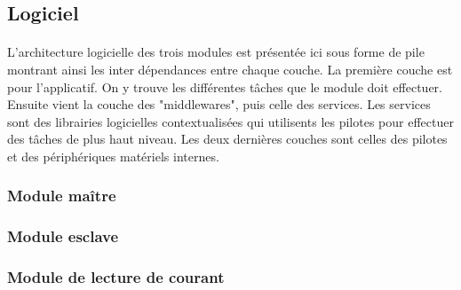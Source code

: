 \subsection{Logiciel}
	\paragraph*{}
	L'architecture logicielle des trois modules est présentée ici sous forme de pile montrant ainsi les inter dépendances entre chaque couche. La première couche est pour l'applicatif. On y trouve les différentes tâches que le module doit effectuer. Ensuite vient la couche des "middlewares", puis celle des services. Les services sont des librairies logicielles contextualisées qui utilisents les pilotes pour effectuer des tâches de plus haut niveau. Les deux dernières couches sont celles des pilotes et des périphériques matériels internes.
	\subsubsection{Module maître}
		\paragraph*{}
	\subsubsection{Module esclave}
		\paragraph*{}
	\subsubsection{Module de lecture de courant}
		\paragraph*{}
